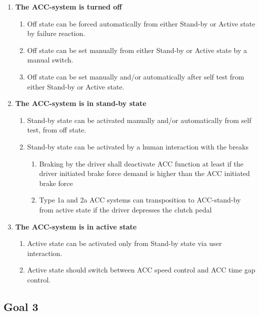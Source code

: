 \begin{enumerate}
    \item {\bf The ACC-system is turned off}
    \begin{enumerate}[label*=\arabic*]
        \item Off state can be forced automatically from either Stand-by or Active state by failure reaction.
        \item Off state can be set manually from either Stand-by or Active state by a manual switch.
        \item Off state can be set manually and/or automatically after self test from either Stand-by or Active state.
    \end{enumerate}

    \item {\bf The ACC-system is in stand-by state}
    \begin{enumerate} [label*=\arabic*]
        \item Stand-by state can be activated manually and/or automatically from self test, from off state.
        \item Stand-by state can be activated by a human interaction with the breaks
        \begin{enumerate}[label*=\arabic*]
            \item Braking by the driver shall deactivate ACC function at least if the driver initiated brake force demand is higher than the ACC initiated brake force
            \item Type 1a and 2a ACC systems can transposition to ACC-stand-by from active state if the driver depresses the clutch pedal
        \end{enumerate}
    \end{enumerate}
    \item {\bf The ACC-system is in active state}
    \begin{enumerate}[label*=\arabic*]
        \item Active state can be activated only from Stand-by state via user interaction.
        \item Active state should switch between ACC speed control and ACC time gap control.
    \end{enumerate}
\end{enumerate}



\subsection{Goal 3}

